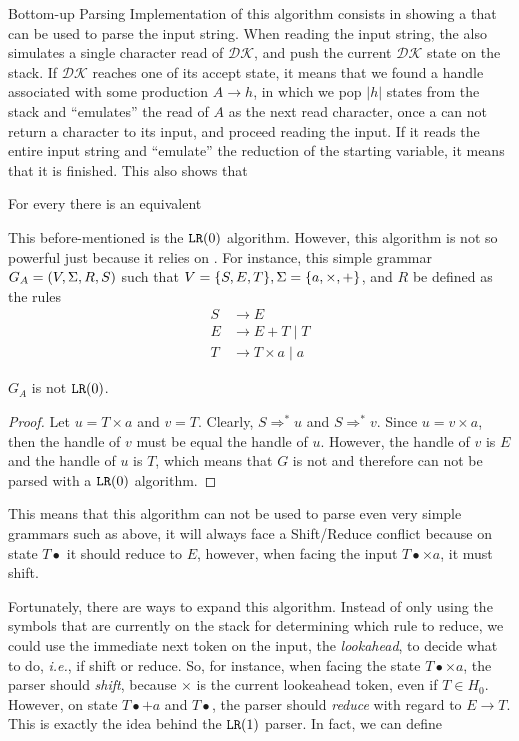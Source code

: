 \begin{section}{Bottom-up Parsing}
Implementation of this algorithm consists in showing a \DPDA that
can be used to parse the input string. When reading the input string,
the \DPDA also simulates a single character read of $\mathcal{DK}$,
and push the current $\mathcal{DK}$ state on the stack. If
$\mathcal{DK}$ reaches one of its accept state, it means that we
found a handle associated with some production $A \rightarrow h$,
in which we pop $|h|$ states from the \DPDA stack and ``emulates''
the read of $A$ as the next read character, once a \DPDA can
not return a character to its input, and proceed reading the input.
If it reads the entire input string and ``emulate'' the reduction
of the starting variable, it means that it is finished. This also
shows that
\begin{lemma}
For every \DCFG there is an equivalent \DPDA
\end{lemma}

This before-mentioned \DPDA is the $\texttt{LR}(0)$ algorithm.
However, this algorithm is not so powerful just because it relies on
\DCFG. For instance, this simple grammar $G_A = (V, \Sigma, R, S)$ such that
$V = \{S, E, T\}, \Sigma = \{a, \times, +\}$, and $R$ be defined as the rules
\begin{align}
S &\rightarrow E \nonumber \\
E &\rightarrow E + T \; | \; T \nonumber \\
T &\rightarrow T \times a \; | \; a \nonumber
\end{align}

\begin{lemma}\label{shift_reduce}
	$G_A$ is not $\texttt{LR}(0)$.
\end{lemma}
\begin{proof}
	Let $u = T \times a$ and $v = T$. Clearly, $S \Rightarrow^* u$ and
	$S \Rightarrow^*v$. Since $u = v \times a$, then the handle of
	$v$ must be equal the handle of $u$. However, the handle of $v$
	is $E$ and the handle of $u$ is $T$, which means that $G$ is not
	 and therefore can not be parsed with a $\texttt{LR}(0)$
	algorithm.
\end{proof}

This means that this algorithm can not be used to parse even very simple
grammars such as above, it will always face a Shift/Reduce conflict
because on state $T\bullet$ it should reduce to $E$, however, when
facing the input $T\bullet \times a$, it must shift.

Fortunately, there are ways to expand this algorithm.
Instead of only using the symbols that are currently on the stack for
determining which rule to reduce, we could use the immediate next
token on the input, the \textit{lookahead}, to decide what to do, \textit{i.e.},
if shift or reduce. So, for instance, when facing the state
$T\bullet \times a$, the parser should \textit{shift}, because
$\times$ is the current lookeahead token, even if $T \in H_0$.
However, on state $T\bullet + a$ and $T\bullet$, the parser should
\textit{reduce} with regard to $E \rightarrow T$. This is exactly the
idea behind the $\texttt{LR}(1)$ parser. In fact, we can define


\end{section}
